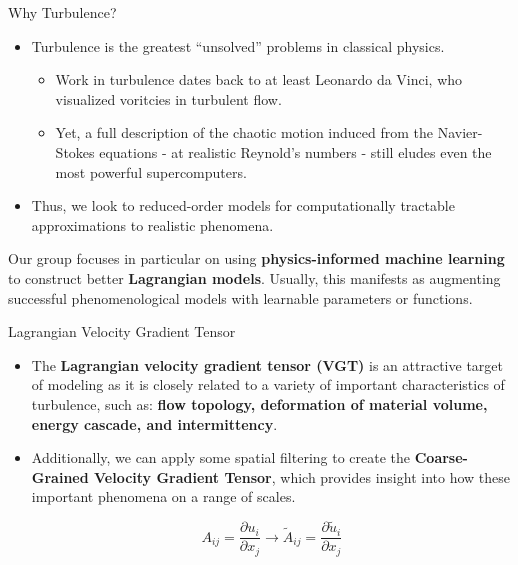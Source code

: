\documentclass[pdf,9pt]{beamer}
\newcommand{\<}{\langle}
\renewcommand{\>}{\rangle}
\begin{document}
\begin{frame}{Why Turbulence?}
  \begin{itemize}
  \item Turbulence is the greatest ``unsolved'' problems in classical physics.
    \begin{itemize}
    \item Work in turbulence dates back to at least Leonardo da Vinci, who visualized voritcies in turbulent flow.
    \item Yet, a full description of the chaotic motion induced from the Navier-Stokes equations - at realistic Reynold's numbers - still eludes even the most powerful supercomputers.
    \end{itemize}

  \item Thus, we look to reduced-order models for computationally tractable approximations to realistic phenomena.

  \end{itemize}
  \vspace{0.25in}
  Our group focuses in particular on using \textbf{physics-informed machine learning} to construct better \textbf{Lagrangian models}. Usually, this manifests as augmenting successful phenomenological models with learnable parameters or functions.
\end{frame}



\begin{frame}{Lagrangian Velocity Gradient Tensor}
  \begin{itemize}
  \item The \textbf{Lagrangian velocity gradient tensor (VGT)} is an attractive target of modeling as it is closely related to a variety of important characteristics of turbulence, such as: \textbf{flow topology, deformation of material volume, energy cascade, and intermittency}.
  \item Additionally, we can apply some spatial filtering to create the \textbf{Coarse-Grained Velocity Gradient Tensor}, which provides insight into how these important phenomena on a range of scales.

    \begin{equation}
      A_{ij} = \frac{\partial u_i}{\partial x_j} \to \tilde{A}_{ij} = \frac{\partial \tilde{u}_i}{\partial x_j}
    \end{equation}

  \end{itemize}
\end{frame}
\end{document}
